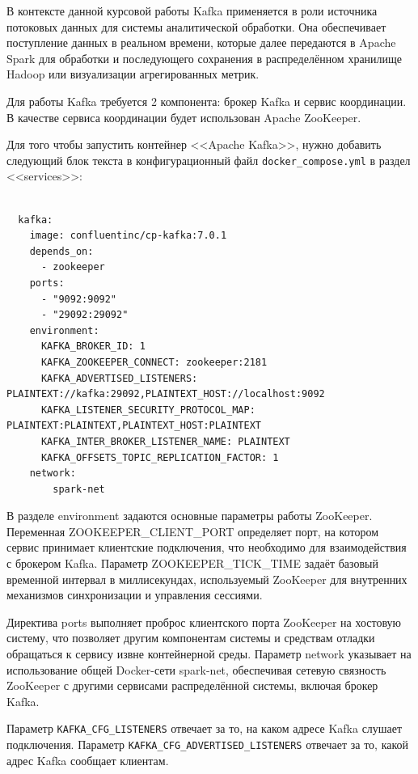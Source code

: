 \documentclass[14pt,a4paper]{extarticle}
\begin{document}
В контексте данной курсовой работы Kafka применяется в роли источника потоковых
данных для системы аналитической обработки. Она обеспечивает поступление данных
в реальном времени, которые далее передаются в Apache Spark для обработки и
последующего сохранения в распределённом хранилище Hadoop или визуализации
агрегированных метрик.

Для работы Kafka требуется 2 компонента: брокер Kafka и сервис координации. В
качестве сервиса координации будет использован Apache ZooKeeper.

Для того чтобы запустить контейнер <<Apache Kafka>>, нужно добавить следующий
блок текста в конфигурационный файл \texttt{docker\_compose.yml} в раздел
<<services>>:

\begin{verbatim}

  kafka:
    image: confluentinc/cp-kafka:7.0.1
    depends_on:
      - zookeeper
    ports:
      - "9092:9092"
      - "29092:29092"
    environment:
      KAFKA_BROKER_ID: 1
      KAFKA_ZOOKEEPER_CONNECT: zookeeper:2181
      KAFKA_ADVERTISED_LISTENERS: PLAINTEXT://kafka:29092,PLAINTEXT_HOST://localhost:9092
      KAFKA_LISTENER_SECURITY_PROTOCOL_MAP: PLAINTEXT:PLAINTEXT,PLAINTEXT_HOST:PLAINTEXT
      KAFKA_INTER_BROKER_LISTENER_NAME: PLAINTEXT
      KAFKA_OFFSETS_TOPIC_REPLICATION_FACTOR: 1
    network:
        spark-net

\end{verbatim}

В разделе environment задаются основные параметры работы ZooKeeper. Переменная
ZOOKEEPER\_CLIENT\_PORT определяет порт, на котором сервис принимает клиентские
подключения, что необходимо для взаимодействия с брокером Kafka. Параметр
ZOOKEEPER\_TICK\_TIME задаёт базовый временной интервал в миллисекундах,
используемый ZooKeeper для внутренних механизмов синхронизации и управления
сессиями.

Директива ports выполняет проброс клиентского порта ZooKeeper на хостовую
систему, что позволяет другим компонентам системы и средствам отладки
обращаться к сервису извне контейнерной среды. Параметр network указывает на
использование общей Docker-сети spark-net, обеспечивая сетевую связность
ZooKeeper с другими сервисами распределённой системы, включая брокер Kafka.

Параметр \texttt{KAFKA\_CFG\_LISTENERS} отвечает за то, на каком адресе Kafka слушает подключения.
Параметр \texttt{KAFKA\_CFG\_ADVERTISED\_LISTENERS} отвечает за то, какой адрес Kafka сообщает клиентам.
\end{document}

